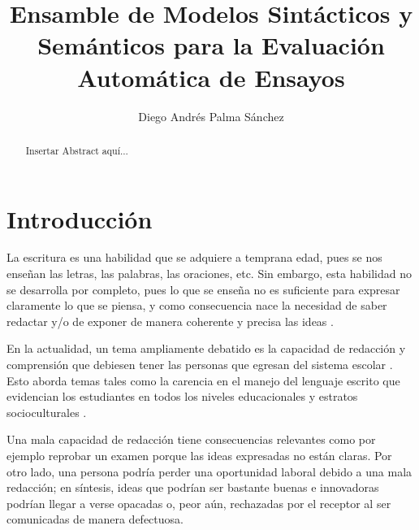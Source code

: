 \documentclass[12pt]{diicc}
\title{\bf Ensamble de Modelos Sintácticos y Semánticos para la Evaluación
Automática de Ensayos}
\author{Diego Andrés Palma Sánchez}
\begin{document}
\frontmatter

%


%
\begin{abstract}
Insertar Abstract aquí...
\end{abstract}

%
% 
\mainmatter
\chapter{Introducción}\label{chap:intro}

La escritura es una habilidad que se adquiere a temprana edad, pues se nos enseñan las letras, las palabras, las oraciones, etc. Sin embargo, esta habilidad no se desarrolla por completo, pues lo que se enseña no es suficiente para expresar claramente lo que se piensa, y como consecuencia nace la necesidad de saber redactar y/o de exponer de manera coherente y precisa las ideas \cite{t21}. 

En la actualidad, un tema ampliamente debatido es la capacidad de redacción y comprensión que debiesen tener las personas que egresan del sistema escolar \cite{t22}. Esto aborda temas tales como la carencia en el manejo del lenguaje escrito que evidencian los estudiantes en todos los niveles educacionales y estratos socioculturales \cite{t23}.

Una mala capacidad de redacción tiene consecuencias relevantes como por ejemplo reprobar un examen porque las ideas expresadas no están claras. Por otro lado, una persona podría perder una oportunidad laboral debido a una mala redacción; en síntesis, ideas que podrían ser bastante buenas e innovadoras podrían llegar a verse opacadas o, peor aún, rechazadas por el receptor al ser comunicadas de manera defectuosa.
\end{document}
